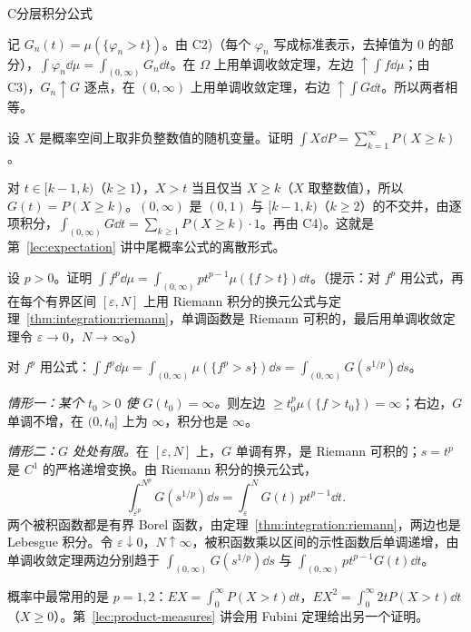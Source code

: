 \begin{probleme}{C}{分层积分公式}
\begin{questions}
\begin{solution}
记 $G_n(t)=\mu(\{\varphi_n>t\})$。由 C2)（每个 $\varphi_n$ 写成标准表示，去掉值为 $0$ 的部分），$\int\varphi_n\dd\mu=\int_{(0,\infty)}G_n\dd t$。在 $\Omega$ 上用单调收敛定理，左边 $\uparrow\int f\dd\mu$；由 C3)，$G_n\uparrow G$ 逐点，在 $(0,\infty)$ 上用单调收敛定理，右边 $\uparrow\int G\dd t$。所以两者相等。
\end{solution}
\item 设 $X$ 是概率空间上取非负整数值的随机变量。证明 $\int X\dd P=\sum_{k=1}^\infty P(X\geqslant k)$。
\begin{solution}
对 $t\in[k-1,k)$（$k\geqslant1$），$X>t$ 当且仅当 $X\geqslant k$（$X$ 取整数值），所以 $G(t)=P(X\geqslant k)$。$(0,\infty)$ 是 $(0,1)$ 与 $[k-1,k)$（$k\geqslant2$）的不交并，由逐项积分，$\int_{(0,\infty)}G\dd t=\sum_{k\geqslant1}P(X\geqslant k)\cdot1$。再由 C4)。这就是第~\ref{lec:expectation} 讲中尾概率公式的离散形式。
\end{solution}
\item 设 $p>0$。证明 $\int f^p\dd\mu=\int_{(0,\infty)}pt^{p-1}\mu(\{f>t\})\dd t$。（提示：对 $f^p$ 用公式，再在每个有界区间 $[\varepsilon,N]$ 上用 Riemann 积分的换元公式与定理~\ref{thm:integration:riemann}，单调函数是 Riemann 可积的，最后用单调收敛定理令 $\varepsilon\to0$，$N\to\infty$。）
\begin{solution}
对 $f^p$ 用公式：$\int f^p\dd\mu=\int_{(0,\infty)}\mu(\{f^p>s\})\dd s=\int_{(0,\infty)}G(s^{1/p})\dd s$。

\emph{情形一：某个 $t_0>0$ 使 $G(t_0)=\infty$。}则左边 $\geqslant t_0^p\mu(\{f>t_0\})=\infty$；右边，$G$ 单调不增，在 $(0,t_0]$ 上为 $\infty$，积分也是 $\infty$。

\emph{情形二：$G$ 处处有限。}在 $[\varepsilon,N]$ 上，$G$ 单调有界，是 Riemann 可积的；$s=t^p$ 是 $C^1$ 的严格递增变换。由 Riemann 积分的换元公式，
\[
\int_{\varepsilon^p}^{N^p}G(s^{1/p})\dd s=\int_\varepsilon^NG(t)\,pt^{p-1}\dd t .
\]
两个被积函数都是有界 Borel 函数，由定理~\ref{thm:integration:riemann}，两边也是 Lebesgue 积分。令 $\varepsilon\downarrow0$，$N\uparrow\infty$，被积函数乘以区间的示性函数后单调递增，由单调收敛定理两边分别趋于 $\int_{(0,\infty)}G(s^{1/p})\dd s$ 与 $\int_{(0,\infty)}pt^{p-1}G(t)\dd t$。

概率中最常用的是 $p=1,2$：$EX=\int_0^\infty P(X>t)\dd t$，$EX^2=\int_0^\infty2tP(X>t)\dd t$（$X\geqslant0$）。第~\ref{lec:product-measures} 讲会用 Fubini 定理给出另一个证明。
\end{solution}
\end{questions}
\end{probleme}


